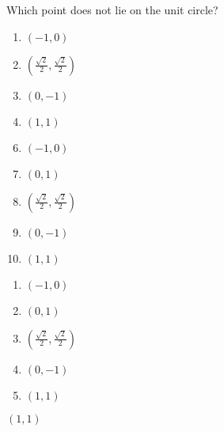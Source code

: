 


  Which point does not lie on the unit circle?


\ifsat
	\begin{enumerate}[label=\Alph*)]
		\item    $(-1,0)$
		\item $(\frac{\sqrt{2}}{2},\frac{\sqrt{2}}{2})$ 
		\item $(0,-1)$
		\item  $(1,1)$ %
	\end{enumerate}
\else
\fi

\ifacteven
	\begin{enumerate}[label=\textbf{\Alph*.},itemsep=\fill,align=left]
		\setcounter{enumii}{5}
		\item    $(-1,0)$
		\item  $(0,1)$
		\item $(\frac{\sqrt{2}}{2},\frac{\sqrt{2}}{2})$ 
		\addtocounter{enumii}{1}
		\item $(0,-1)$
		\item  $(1,1)$ %
	\end{enumerate}
\else
\fi

\ifactodd
	\begin{enumerate}[label=\textbf{\Alph*.},itemsep=\fill,align=left]
		\item    $(-1,0)$
		\item  $(0,1)$
		\item $(\frac{\sqrt{2}}{2},\frac{\sqrt{2}}{2})$ 
		\item $(0,-1)$
		\item  $(1,1)$ %
	\end{enumerate}
\else
\fi

\ifgridin
  $(1,1)$ %

\else
\fi

